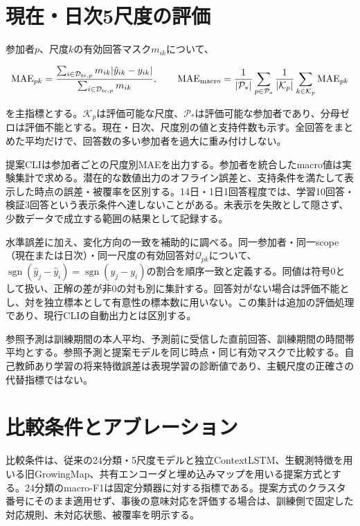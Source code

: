 \section{現在・日次5尺度の評価}

参加者\(p\)、尺度\(k\)の有効回答マスク\(m_{ik}\)について、

\[
\operatorname{MAE}_{pk}=
\frac{\sum_{i\in\mathcal D_{{\rm te},p}}m_{ik}|\hat y_{ik}-y_{ik}|}
{\sum_{i\in\mathcal D_{{\rm te},p}}m_{ik}},\qquad
\operatorname{MAE}_{\rm macro}=\frac1{|\mathcal P_*|}\sum_{p\in\mathcal P_*}
\frac1{|\mathcal K_p|}\sum_{k\in\mathcal K_p}\operatorname{MAE}_{pk}
\]

を主指標とする。\(\mathcal K_p\)は評価可能な尺度、\(\mathcal P_*\)は評価可能な参加者であり、分母ゼロは評価不能とする。現在・日次、尺度別の値と支持件数も示す。全回答をまとめた平均だけで、回答数の多い参加者を過大に重み付けしない。

提案CLIは参加者ごとの尺度別MAEを出力する。参加者を統合したmacro値は実験集計で求める。潜在的な数値出力のオフライン誤差と、支持条件を満たして表示した時点の誤差・被覆率を区別する。14日・1日1回答程度では、学習10回答・検証3回答という表示条件へ達しないことがある。未表示を失敗として隠さず、少数データで成立する範囲の結果として記録する。

水準誤差に加え、変化方向の一致を補助的に調べる。同一参加者・同一scope（現在または日次）・同一尺度の有効回答対\(\mathcal Q_{pk}\)について、\(\operatorname{sgn}(\hat y_j-\hat y_i)=\operatorname{sgn}(y_j-y_i)\)の割合を順序一致と定義する。同値は符号0として扱い、正解の差が非0の対も別に集計する。回答対がない場合は評価不能とし、対を独立標本として有意性の標本数に用いない。この集計は追加の評価処理であり、現行CLIの自動出力とは区別する。

参照予測は訓練期間の本人平均、予測前に受信した直前回答、訓練期間の時間帯平均とする。参照予測と提案モデルを同じ時点・同じ有効マスクで比較する。自己教師あり学習の将来特徴誤差は表現学習の診断値であり、主観尺度の正確さの代替指標ではない。

\section{比較条件とアブレーション}

比較条件は、従来の24分類・5尺度モデルと独立ContextLSTM、生観測特徴を用いる旧GrowingMap、共有エンコーダと埋め込みマップを用いる提案方式とする。24分類のmacro-F1は固定分類器に対する指標である。提案方式のクラスタ番号にそのまま適用せず、事後の意味対応を評価する場合は、訓練側で固定した対応規則、未対応状態、被覆率を明示する。

